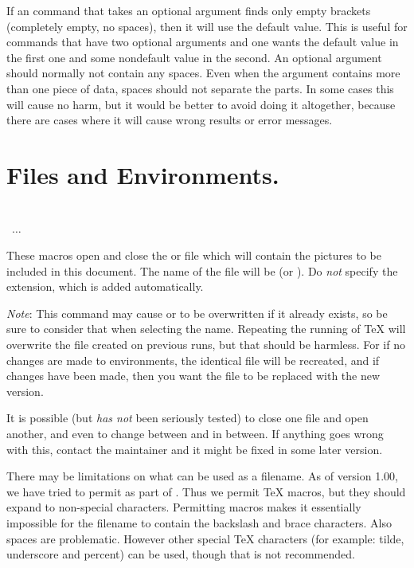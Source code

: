 \documentclass[letterpaper]{article}
\begin{document}
If an \mfp{} command that takes an optional argument finds only empty
brackets (completely empty, no spaces), then it will use the default
value. This is useful for commands that have two optional arguments and
one wants the default value in the first one and some nondefault value
in the second. An optional argument should normally not contain any
spaces. Even when the argument contains more than one piece of data,
spaces should not separate the parts. In some cases this will cause no
harm, but it would be better to avoid doing it altogether, because there
are cases where it will cause wrong results or error messages.


\section{Files and Environments.}\label{files}

\begin{cd}
\\
  \ $\ldots$\\
%
%
\end{cd}

These macros open and close the \MF{} or \MP{} file which will contain
the pictures to be included in this document.  The name of the file will
be  (or ). Do \emph{not}
specify the extension, which is added automatically.

\emph{Note}: This command may cause  or
 to be overwritten if it already exists, so be sure
to consider that when selecting the name. Repeating the running of
\TeX{} will overwrite the file created on previous runs, but that should
be harmless. For if no changes are made to  environments, the
identical file will be recreated, and if changes have been made, then
you want the file to be replaced with the new version.

It is possible (but \emph{has not} been seriously tested) to close one
file and open another, and even to change between  and
 in between. If anything goes wrong with this, contact the
maintainer and it might be fixed in some later version.

There may be limitations on what can be used as a filename. As of \mfp{}
version 1.00, we have tried to permit  as part of
. Thus we permit \TeX{} macros, but they should expand to
non-special characters. Permitting macros makes it essentially
impossible for the filename to contain the backslash and brace
characters. Also spaces are problematic. However other special \TeX{}
characters (for example: tilde, underscore and percent) can be used,
though that is not recommended.
\end{document}
